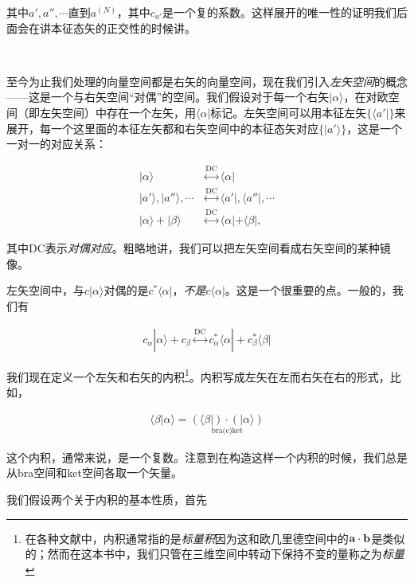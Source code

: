 \documentclass[UTF8,twoside]{ctexart}
\begin{document}
\noindent 其中$a', a'', \cdots$直到$a^{(N)}$，其中$c_{a'}$是一个复的系数。这样展开的唯一性的证明我们后面会在讲本征态矢的正交性的时候讲。

\ 


\noindent 至今为止我们处理的向量空间都是右矢的向量空间，现在我们引入{\emph{左矢空间}}的概念——这是一个与右矢空间“对偶”的空间。我们假设对于每一个右矢$|\alpha\rangle$，在对欧空间（即左矢空间）中存在一个左矢，用$\langle \alpha|$标记。左矢空间可以用本征左矢$\{\langle a'|\}$来展开，每一个这里面的本征左矢都和右矢空间中的本征态矢对应$\{|a'\rangle\}$，这是一个一对一的对应关系：

\begin{equation}
\begin{split}
|\alpha\rangle &\overset{\text{DC}}{\longleftrightarrow}\langle\alpha|\\
|a'\rangle, |a''\rangle, \cdots&\overset{\text{DC}}{\longleftrightarrow}\langle a'|,\langle a''|,\cdots\\
|\alpha\rangle + |\beta\rangle &\overset{\text{DC}}{\longleftrightarrow} \langle\alpha|+\langle\beta|,
\end{split}
\end{equation}

\noindent 其中DC表示\emph{对偶对应}。粗略地讲，我们可以把左矢空间看成右矢空间的某种镜像。

左矢空间中，与$c|\alpha\rangle$对偶的是$c^*\langle\alpha|$，\emph{不是}$c\langle\alpha|$。这是一个很重要的点。一般的，我们有

\begin{align}
c_{\alpha}|\alpha\rangle + c_{\beta}\overset{\text{DC}}{\longleftrightarrow}c_{\alpha}^*\langle\alpha|+c_{\beta}^*\langle\beta|
\end{align}

我们现在定义一个左矢和右矢的内积\footnote{在各种文献中，内积通常指的是\emph{标量积}因为这和欧几里德空间中的$\bf a\cdot b$是类似的；然而在这本书中，我们只管在三维空间中转动下保持不变的量称之为\emph{标量}}。内积写成左矢在左而右矢在右的形式，比如，

\begin{align}
\langle\beta|\alpha\rangle = \underset{\text{bra(c)ket}}{\displaystyle(\langle\beta|)\cdot(|\alpha\rangle)}
\end{align}

这个内积，通常来说，是一个复数。注意到在构造这样一个内积的时候，我们总是从bra空间和ket空间各取一个矢量。

我们假设两个关于内积的基本性质，首先
\end{document}
